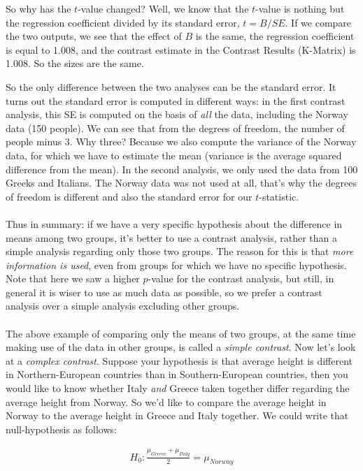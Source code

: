 \documentclass[]{book}\usepackage[]{graphicx}\usepackage[]{color}
\begin{document}
So why has the $t$-value changed? Well, we know that the $t$-value is nothing but the regression coefficient divided by its standard error, $t=B/{SE}$. If we compare the two outputs, we see that the effect of $B$ is the same, the regression coefficient is equal to 1.008, and the contrast estimate in the Contrast Results (K-Matrix) is 1.008. So the sizes are the same. 

So the only difference between the two analyses can be the standard error. It turns out the standard error is computed in different ways: in the first contrast analysis, this SE is computed on the basis of \textit{all} the data, including the Norway data (150 people). We can see that from the degrees of freedom, the number of people minus 3. Why three? Because we also compute the variance of the Norway data, for which we have to estimate the mean (variance is the average squared difference from the mean). In the second analysis, we only used the data from 100 Greeks and Italians. The Norway data was not used at all, that's why the degrees of freedom is different and also the standard error for our $t$-statistic. 
\\
\\
Thus in summary: if we have a very specific hypothesis about the difference in means among two groups, it's better to use a contrast analysis, rather than a simple analysis regarding only those two groups. The reason for this is that \textit{more information is used}, even from groups for which we have no specific hypothesis. 
\\
Note that here we saw a higher $p$-value for the contrast analysis, but still, in general it is wiser to use as much data as possible, so we prefer a contrast analysis over a simple analysis excluding other groups.
\\
\\
The above example of comparing only the means of two groups, at the same time making use of the data in other groups, is called a \textit{simple contrast}. Now let's look at a \textit{complex contrast}. Suppose your hypothesis is that average height is different in Northern-European countries than in Southern-European countries, then you would like to know whether Italy \textit{and} Greece taken together differ regarding the average height from Norway. So we'd like to compare the average height in Norway to the average height in Greece and Italy together. We could write that null-hypothesis as follows:

\begin{eqnarray}
H_0 : \frac{\mu_{Greece}+ \mu_{Italy}}{2} = \mu_{Norway}
\end{eqnarray}
\end{document}
